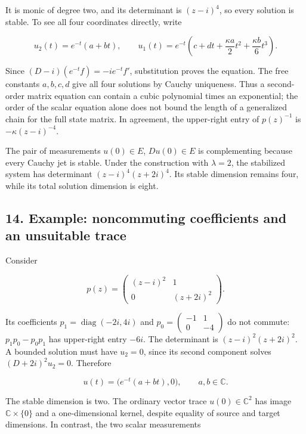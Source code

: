 \documentclass[
  11pt,
]{article}
\begin{document}
It is monic of degree two, and its determinant is \((z-i)^4\), so every
solution is stable. To see all four coordinates directly, write

\[
u_2(t)=e^{-t}(a+bt),\qquad
u_1(t)=e^{-t}
\left(c+dt+\frac{\kappa a}{2}t^2+\frac{\kappa b}{6}t^3\right).
\]

Since \((D-i)(e^{-t}f)=-ie^{-t}f'\), substitution proves the equation.
The free constants \(a,b,c,d\) give all four solutions by Cauchy
uniqueness. Thus a second-order matrix equation can contain a cubic
polynomial times an exponential; the order of the scalar equation alone
does not bound the length of a generalized chain for the full state
matrix. In agreement, the upper-right entry of \(p(z)^{-1}\) is
\(-\kappa(z-i)^{-4}\).

The pair of measurements \(u(0)\in E\), \(Du(0)\in E\) is complementing
because every Cauchy jet is stable. Under the construction with
\(\lambda=2\), the stabilized system has determinant
\((z-i)^4(z+2i)^4\). Its stable dimension remains four, while its total
solution dimension is eight.

\subsection{14. Example: noncommuting coefficients and an unsuitable
trace}\label{example-noncommuting-coefficients-and-an-unsuitable-trace}

Consider

\[
p(z)=
\begin{pmatrix}(z-i)^2&1\\0&(z+2i)^2\end{pmatrix}.
\]

Its coefficients \(p_1=\operatorname{diag}(-2i,4i)\) and
\(p_0=\left(\begin{smallmatrix}-1&1\\0&-4\end{smallmatrix}\right)\) do
not commute: \(p_1p_0-p_0p_1\) has upper-right entry \(-6i\). The
determinant is \((z-i)^2(z+2i)^2\). A bounded solution must have
\(u_2=0\), since its second component solves \((D+2i)^2u_2=0\).
Therefore

\[
u(t)=\big(e^{-t}(a+bt),0\big),\qquad a,b\in\mathbb C.
\]

The stable dimension is two. The ordinary vector trace
\(u(0)\in\mathbb C^2\) has image \(\mathbb C\times\{0\}\) and a
one-dimensional kernel, despite equality of source and target
dimensions. In contrast, the two scalar measurements
\end{document}
